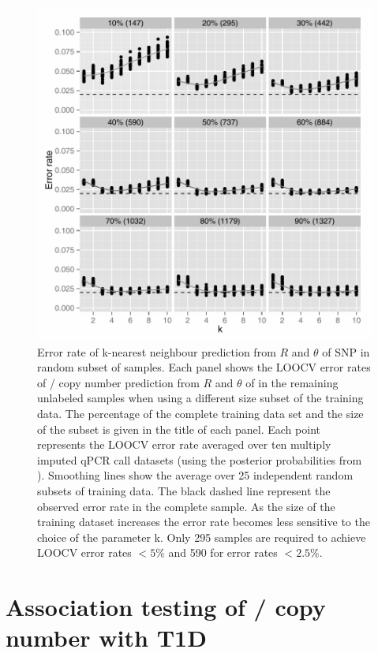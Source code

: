 \begin{figure}[h!]
  \centering
  \includegraphics[scale=.5]{KIR/figures/Figure-4.pdf}
  {Error rate of k-nearest neighbour prediction from $R$ and $\theta$ of SNP  in random subset of samples.}
  { Each panel shows the LOOCV error rates of / copy number prediction
  from $R$ and $\theta$ of  in the remaining unlabeled samples
  when using a different size subset of the training data.
  The percentage of the complete training data set and the size of the subset is given in the title of each panel.
  Each point represents the LOOCV error rate averaged over ten multiply imputed qPCR call datasets
  (using the posterior probabilities from ). 
  Smoothing lines show the average over 25 independent random subsets of training data.
  The black dashed line represent the observed error rate in the complete sample.
  As the size of the training dataset increases the error rate becomes less sensitive to the choice of the parameter k.
  Only 295 samples are required to achieve LOOCV error rates $<5\%$ and 590 for error rates $<2.5\%$. }
\end{figure}

\section{Association testing of / copy number with T1D}

